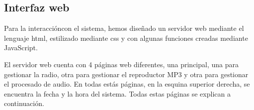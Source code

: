 \subsection{Interfaz web}
Para la interaccióncon el sistema, hemos diseñado un servidor web mediante el lenguaje html, estilizado mediante css y con algunas funciones creadas mediante JavaScript.

El servidor web cuenta con 4 páginas web diferentes, una principal, una para gestionar la radio, otra para gestionar el reproductor MP3 y otra para gestionar el procesado de audio. En todas estás páginas, en la esquina superior derecha, se encuentra la fecha y la hora del sistema. Todas estas páginas se explican a continuación.